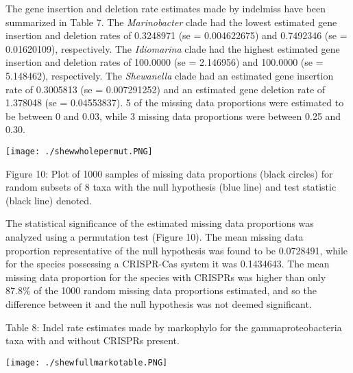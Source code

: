 \documentclass[english]{article}
\begin{document}
The gene insertion and deletion rate estimates made by indelmiss have
been summarized in Table 7. The \textit{Marinobacter}  clade had the lowest estimated  
gene insertion   and
deletion rates  of 0.3248971 (se = 0.004622675) and 0.7492346 (se =
0.01620109), respectively. The \textit{Idiomarina} clade had the highest
estimated gene insertion and deletion rates of 100.0000 (se =
2.146956) and 100.0000 (se = 5.148462), respectively. The
\textit{Shewanella}
clade had an estimated gene insertion rate of 0.3005813 (se =
0.007291252) and an estimated gene deletion rate of 1.378048 (se =
0.04553837). 5 of the missing data proportions were estimated to be
between 0 and 0.03, while 3 missing data proportions were between 0.25
and 0.30.  

\singlespacing
\texttt{[image: ./shewwholepermut.PNG]}
\caption{Figure 10: Plot of 1000 samples of missing data proportions
(black circles) for random subsets of 8 taxa with the null hypothesis
(blue line) and test statistic (black line) denoted.}
\singlespacing

The  statistical significance of the  estimated  missing data
proportions  was analyzed using a permutation test  (Figure  10).  The
mean missing data proportion  representative of the  null  hypothesis
was found  to  be 0.0728491, while for the  species possessing a
CRISPR-Cas system it was 0.1434643. The mean missing data proportion
for the species with CRISPRs  was higher than  only 87.8\% of the 1000
random missing data proportions estimated,   and  so the  difference
between  it  and  the  null  hypothesis  was not  deemed significant.

\singlespacing
\caption{Table 8: Indel rate estimates made by markophylo for the
gammaproteobacteria taxa with and without CRISPRs present.}
\newline
\texttt{[image: ./shewfullmarkotable.PNG]}
\singlespacing
\end{document}
